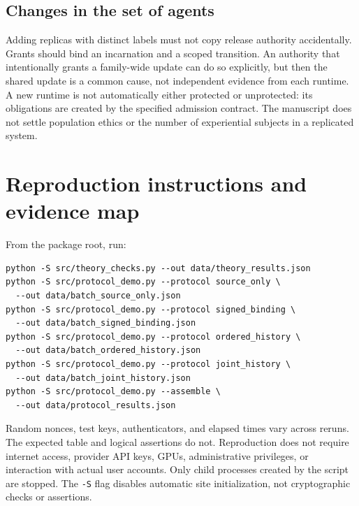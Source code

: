 \subsection{Changes in the set of agents}
Adding replicas with distinct labels must not copy release authority accidentally. Grants should bind an incarnation and a scoped transition. An authority that intentionally grants a family-wide update can do so explicitly, but then the shared update is a common cause, not independent evidence from each runtime. A new runtime is not automatically either protected or unprotected: its obligations are created by the specified admission contract. The manuscript does not settle population ethics or the number of experiential subjects in a replicated system.

\section{Reproduction instructions and evidence map}
From the package root, run:
\begin{lstlisting}
python -S src/theory_checks.py --out data/theory_results.json
python -S src/protocol_demo.py --protocol source_only \
  --out data/batch_source_only.json
python -S src/protocol_demo.py --protocol signed_binding \
  --out data/batch_signed_binding.json
python -S src/protocol_demo.py --protocol ordered_history \
  --out data/batch_ordered_history.json
python -S src/protocol_demo.py --protocol joint_history \
  --out data/batch_joint_history.json
python -S src/protocol_demo.py --assemble \
  --out data/protocol_results.json
\end{lstlisting}
Random nonces, test keys, authenticators, and elapsed times vary across reruns. The expected table and logical assertions do not. Reproduction does not require internet access, provider API keys, GPUs, administrative privileges, or interaction with actual user accounts. Only child processes created by the script are stopped. The \texttt{-S} flag disables automatic site initialization, not cryptographic checks or assertions.

